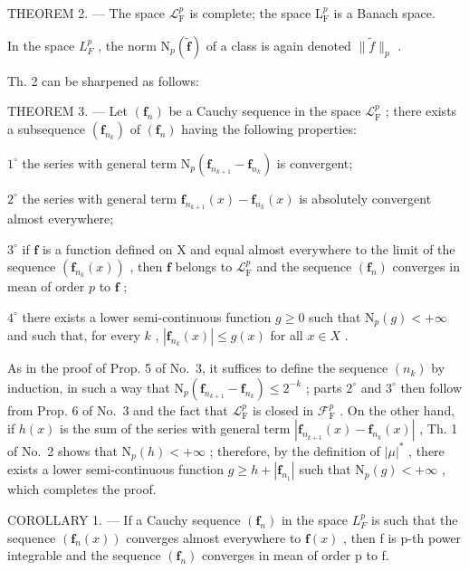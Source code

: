 THEOREM 2. --- The space \(\mathcal{L}_{\mathrm{F}}^{p}\) is complete; the space \(\mathrm{L}_{\mathrm{F}}^{p}\) is a Banach space.

In the space \(L_{F}^{p}\) , the norm \(\mathrm{N}_{p}(\widetilde{\mathbf{f}})\) of a class is again denoted \(\| \widetilde{f} \|_{p}\) .

Th. 2 can be sharpened as follows:

THEOREM 3. --- Let \((\mathbf{f}_n)\) be a Cauchy sequence in the space \(\mathcal{L}_{\mathrm{F}}^p\) ; there exists a subsequence \((\mathbf{f}_{n_k})\) of \((\mathbf{f}_n)\) having the following properties:

\(1^{\circ}\) the series with general term \(\mathrm{N}_p(\mathbf{f}_{n_{k + 1}} - \mathbf{f}_{n_k})\) is convergent;

\(2^{\circ}\) the series with general term \(\mathbf{f}_{n_{k+1}}(x) - \mathbf{f}_{n_k}(x)\) is absolutely convergent almost everywhere;

\(3^{\circ}\) if \(\mathbf{f}\) is a function defined on X and equal almost everywhere to the limit of the sequence \((\mathbf{f}_{n_k}(x))\) , then \(\mathbf{f}\) belongs to \(\mathcal{L}_{\mathrm{F}}^p\) and the sequence \((\mathbf{f}_n)\) converges in mean of order \(p\) to \(\mathbf{f}\) ;

\(4^{\circ}\) there exists a lower semi-continuous function \(g \geqslant 0\) such that \(\mathrm{N}_p(g) < +\infty\) and such that, for every \(k\) , \(|\mathbf{f}_{n_k}(x)| \leqslant g(x)\) for all \(x \in X\) .

As in the proof of Prop. 5 of No.~3, it suffices to define the sequence \((n_k)\) by induction, in such a way that \(\mathrm{N}_p(\mathbf{f}_{n_{k+1}} - \mathbf{f}_{n_k}) \leqslant 2^{-k}\) ; parts \(2^\circ\) and \(3^\circ\) then follow from Prop. 6 of No.~3 and the fact that \(\mathcal{L}_{\mathrm{F}}^p\) is closed in \(\mathcal{F}_{\mathrm{F}}^p\) . On the other hand, if \(h(x)\) is the sum of the series with general term \(|\mathbf{f}_{n_{k+1}}(x) - \mathbf{f}_{n_k}(x)|\) , Th. 1 of No.~2 shows that \(\mathrm{N}_p(h) < +\infty\) ; therefore, by the definition of \(|\mu|^*\) , there exists a lower semi-continuous function \(g \geqslant h + |\mathbf{f}_{n_1}|\) such that \(\mathrm{N}_p(g) < +\infty\) , which completes the proof.

COROLLARY 1. --- If a Cauchy sequence \((\mathbf{f}_{n})\) in the space \(L_{F}^{p}\) is such that the sequence \((\mathbf{f}_{n}(x))\) converges almost everywhere to \(\mathbf{f}(x)\) , then f is p-th power integrable and the sequence \((\mathbf{f}_{n})\) converges in mean of order p to f.

